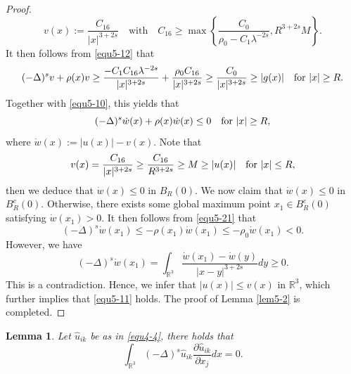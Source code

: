 \documentclass[reqno, 11pt]{amsart} %
\numberwithin{equation}{section}
\newtheorem{lemma}[theorem]{Lemma}
\begin{document}
\begin{proof}
		\begin{equation*}
			v(x):=\frac{C_{16}}{|x|^{3+2s}}\quad \mathrm {with} \quad C_{16}\geq\max \left\lbrace\frac{C_{0}}{\rho_{0}-C_{1}\lambda^{-2s}},  R^{3+2s}M \right\rbrace.
		\end{equation*}
		It then follows from \eqref{equ5-12} that
		\begin{equation}\label{equ5-20}
			(-\Delta)^{s}v+\rho(x)v\geq\frac{-C_{1}C_{16}\lambda^{-2s}}{|x|^{3+2s}}+\frac{\rho_{0}C_{16}}{|x|^{3+2s}}\geq\frac{C_{0}}{|x|^{3+2s}}\geq|g(x)|\quad \hbox{for $|x|\geq R$}.
		\end{equation}
		Together with \eqref{equ5-10}, this yields that
		\begin{equation}\label{equ5-21}
			(-\Delta)^{s}\dot{w}(x)+\rho(x)\dot{w}(x)\leq0 \quad \hbox{for $|x|\geq R$},
		\end{equation}
		where $\dot{w}(x):=|u(x)|-v(x)$. Note that
		\begin{equation*}
			v(x)=\frac{C_{16}}{|x|^{3+2s}}\geq\frac{C_{16}}{R^{3+2s}}\geq M\geq|u(x)|\quad \hbox{for $|x|\leq R$},
		\end{equation*}
		then we deduce that $\dot{w}(x)\leq0$ in $B_{R}(0)$. We now claim that $\dot{w}(x)\leq0$ in $B^{c}_{R}(0)$. Otherwise, there exists some global maximum point $x_{1}\in B^{c}_{R}(0)$ satisfying $\dot{w}(x_{1})>0$. It then follows from \eqref{equ5-21} that
		\begin{equation*}
			(-\Delta)^{s}\dot{w}(x_{1})\leq-\rho(x_{1})\dot{w}(x_{1})\leq-\rho_{0}\dot{w}(x_{1})<0.
		\end{equation*}
		However, we have
		\begin{equation*}
			(-\Delta)^{s}\dot{w}(x_{1})=\int_{\mathbb{R}^{3}}\frac{\dot{w}(x_{1})-\dot{w}(y)}{|x-y|^{3+2s}}dy\geq0.
		\end{equation*}
		This is a contradiction. Hence, we infer that $|u(x)|\leq v(x)$ in $\mathbb{R}^{3}$, which further implies that \eqref{equ5-11} holds. The proof of Lemma \ref{lem5-2} is completed.
	\end{proof}
	\begin{lemma}\label{lem5-3}
		Let $\hat{u}_{ik}$ be as in \eqref{equ4-4}, there holds that
		\begin{equation*}
			\int_{\mathbb{R}^{3}}(-\Delta)^{s} \hat{u}_{ik}\frac{\partial\hat{u}_{ik}}{\partial x_{j}}dx=0.
		\end{equation*}
	\end{lemma}
\end{document}
